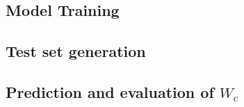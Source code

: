\documentclass[reprint,amsmath,amssymb,aps,prb]{revtex4-2}
\begin{document}
\begin{widetext}
\subsection{Model Training}


\subsection{Test set generation}


\subsection{Prediction and evaluation of $W_c$}

%
\end{widetext}
\end{document}

